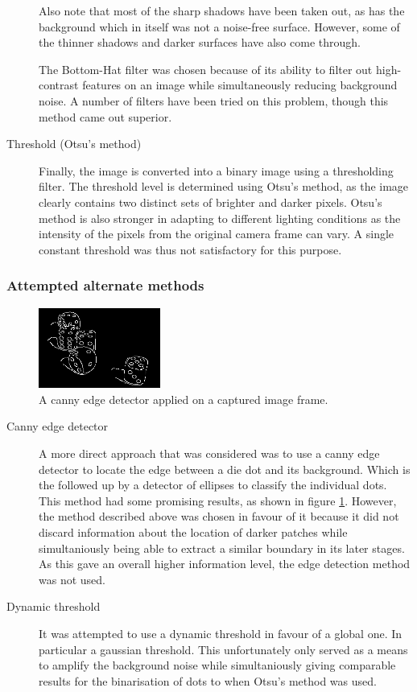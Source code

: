 \begin{description}
Also note that most of the sharp shadows have been taken out, as has the background which in itself was not a noise-free surface. However, some of the thinner shadows and darker surfaces have also come through.

The Bottom-Hat filter was chosen because of its ability to filter out high-contrast features on an image while simultaneously reducing background noise. A number of filters have been tried on this problem, though this method came out superior.

\item[Threshold (Otsu's method)] Finally, the image is converted into a binary image using a thresholding filter. The threshold level is determined using Otsu's method, as the image clearly contains two distinct sets of brighter and darker pixels. Otsu's method is also stronger in adapting to different lighting conditions as the intensity of the pixels from the original camera frame can vary. A single constant threshold was thus not satisfactory for this purpose.

\end{description}

\subsubsection{Attempted alternate methods}

\begin{figure}
	\centering
	\includegraphics[width=40mm]{images/dies/canny_2.png}
	\caption{A canny edge detector applied on a captured image frame.}
	\label{fig:cannyEdge}
\end{figure}

\begin{description}
	\item[Canny edge detector] A more direct approach that was considered was to use a canny edge detector to locate the edge between a die dot and its background. Which is the followed up by a detector of ellipses to classify the individual dots. This method had some promising results, as shown in figure \ref{fig:cannyEdge}. However, the method described above was chosen in favour of it because it did not discard information about the location of darker patches while simultaniously being able to extract a similar boundary in its later stages. As this gave an overall higher information level, the edge detection method was not used.
	\item[Dynamic threshold] It was attempted to use a dynamic threshold in favour of a global one. In particular a gaussian threshold. This unfortunately only served as a means to amplify the background noise while simultaniously giving comparable results for the binarisation of dots to when Otsu's method was used.
\end{description}